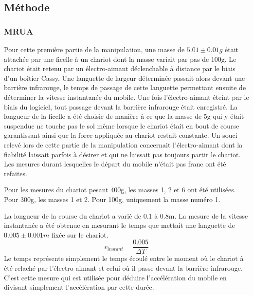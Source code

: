 \subsection{Méthode}

\subsubsection{MRUA}
Pour cette première partie de la manipulation, une masse de $5.01 \pm 0.01g$ était attachée par une ficelle à un chariot dont la masse variait par pas de 100g. Le chariot était retenu par un électro-aimant déclenchable à distance par le biais d'un boîtier Cassy. Une languette de largeur déterminée passait alors devant une barrière infrarouge, le temps de passage de cette languette permettant ensuite de déterminer la vitesse instantanée du mobile. Une fois l'électro-aimant éteint par le biais du logiciel, tout passage devant la barrière infrarouge était enregistré.
La longueur de la ficelle a été choisie de manière à ce que la masse de 5g qui y était suspendue ne touche pas le sol même lorsque le chariot était en bout de course garantissant ainsi que la force appliquée au chariot restait constante.
Un souci relevé lors de cette partie de la manipulation concernait l'électro-aimant dont la fiabilité laissait parfois à désirer et qui ne laissait pas toujours partir le chariot. Les mesures durant lesquelles le départ du mobile n'était pas franc ont été refaites.

Pour les mesures du chariot pesant 400g, les masses 1, 2 et 6 ont été utilisées. Pour 300g, les masses 1 et 2. Pour 100g, uniquement la masse numéro 1.

La longueur de la course du chariot a varié de 0.1 à 0.8m. La mesure de la vitesse instantanée a été obtenue en mesurant le temps que mettait une languette de $0.005 \pm 0.001m$ fixée sur le chariot.
\begin{equation}
    \label{vinstant}
    v_{instant} = \frac{0.005}{\Delta T}
\end{equation}
Le temps représente simplement le temps écoulé entre le moment où le chariot à été relaché par l'électro-aimant et celui où il passe devant la barrière infrarouge. C'est cette mesure qui est utilisée pour déduire l'accélération du mobile en divisant simplement l'accélération par cette durée.

\newpage

